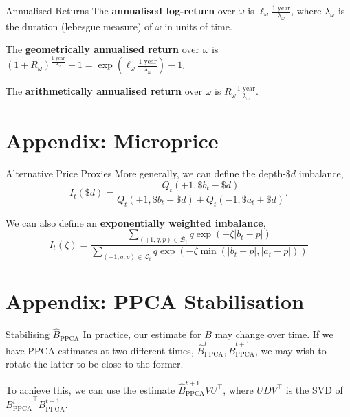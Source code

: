 \documentclass{beamer}
\begin{document}
\begin{frame}{Annualised Returns}
	The \textbf{annualised log-return} over $\omega$ is $\ell_\omega \frac{\textrm{1 year}}{\lambda_\omega}$, where $\lambda_\omega$ is the duration (lebesgue measure) of $\omega$ in units of time.%

	The \textbf{geometrically annualised return} over $\omega$ is $(1 + R_\omega)^\frac{\textrm{1 year}}{\lambda_\omega} - 1 = \exp\left(\ell_\omega \frac{\textrm{1 year}}{\lambda_\omega}\right) - 1$.

	The \textbf{arithmetically annualised return} over $\omega$ is $R_\omega \frac{\textrm{1 year}}{\lambda_\omega}$. %

\end{frame}

\section{Appendix: Microprice}
\begin{frame}{Alternative Price Proxies}
	More generally, we can define the depth-$\$d$ imbalance,
	$$I_t(\$d)=\frac{Q_t(+1,\$b_t-\$d)}{Q_t(+1,\$b_t-\$d)+Q_t(-1,\$a_t+\$d)}.$$%

	We can also define an \textbf{exponentially weighted imbalance},
	$$I_t(\zeta) = \frac{\sum_{(+1,q,p)\in\mathcal{B}_t}q\exp(-\zeta\vert b_t-p\vert)}{\sum_{(+1,q,p)\in\mathcal{L}_t}q\exp(-\zeta\min(\vert b_t-p\vert,\vert a_t-p\vert))}$$%
\end{frame}

\section{Appendix: PPCA Stabilisation}
\begin{frame}{Stabilising $\hat{B}_{\textrm{PPCA}}$}
	In practice, our estimate for $B$ may change over time. If we have PPCA estimates at two different times, $\hat{B}_{\textrm{PPCA}}^t,\hat{B}_{\textrm{PPCA}}^{t+1}$, we may wish to rotate the latter to be close to the former.

	To achieve this, we can use the estimate $\hat{B}_{\textrm{PPCA}}^{t+1}VU^\top$, where $UDV^\top$ is the SVD of ${B_{\textrm{PPCA}}^t}^\top B_{\textrm{PPCA}}^{t+1}$.%
\end{frame}
\end{document}
